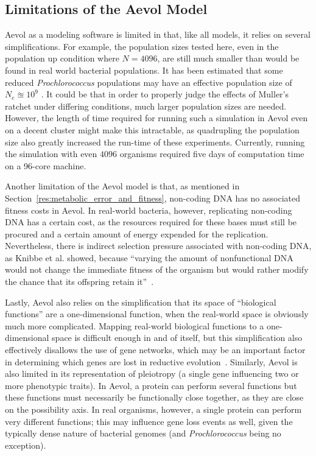 \subsection{Limitations of the Aevol Model}
Aevol as a modeling software is limited in that, like all models, it relies on several simplifications. For example, the population sizes tested here, even in the population up condition where $N = 4096$, are still much smaller than would be found in real world bacterial populations. It has been estimated that some reduced \textit{Prochlorococcus} populations may have an effective population size of $N_e \approxeq 10^9$ \cite{kashtan2014single}. It could be that in order to properly judge the effects of Muller's ratchet under differing conditions, much larger population sizes are needed. However, the length of time required for running such a simulation in Aevol even on a decent cluster might make this intractable, as quadrupling the population size also greatly increased the run-time of these experiments. Currently, running the simulation with even $4096$ organisms required five days of computation time on a 96-core machine. 

Another limitation of the Aevol model is that, as mentioned in Section~\ref{res:metabolic_error_and_fitness}, non-coding DNA has no associated fitness costs in Aevol. In real-world bacteria, however, replicating non-coding DNA has a certain cost, as the resources required for these bases must still be procured and a certain amount of energy expended for the replication. Nevertheless, there is indirect selection pressure associated with non-coding DNA, as Knibbe et al. showed, because ``varying the amount of nonfunctional DNA would not change the immediate fitness of the organism but would rather modify the chance that its offspring retain it''~\cite{Knibbe2007}. 

Lastly, Aevol also relies on the simplification that its space of ``biological functions'' are a one-dimensional function, when the real-world space is obviously much more complicated. Mapping real-world biological functions to a one-dimensional space is difficult enough in and of itself, but this simplification also effectively disallows the use of gene networks, which may be an important factor in determining which genes are lost in reductive evolution~\cite{wilcox2003consequences}. Similarly, Aevol is also limited in its representation of pleiotropy (a single gene influencing two or more phenotypic traits). In Aevol, a protein can perform several functions but these functions must necessarily be functionally close together, as they are close on the possibility axis. In real organisms, however, a single protein can perform very different functions; this may influence gene loss events as well, given the typically dense nature of bacterial genomes (and \textit{Prochlorococcus} being no exception).